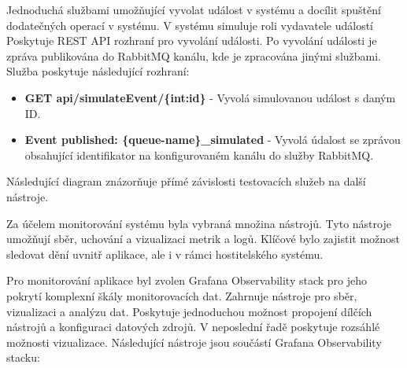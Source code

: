 
Jednoduchá službami umožňující vyvolat událost v systému a docílit spuštění dodatečných operací v systému. V systému simuluje roli vydavatele událostí Poskytuje REST API rozhraní pro vyvolání události. Po vyvolání události je zpráva publikována do RabbitMQ kanálu, kde je zpracována jinými službami. Služba poskytuje následující rozhraní:

\begin{itemize}
    \item \textbf{GET api/simulateEvent/\{int:id\}} - Vyvolá simulovanou událost s daným ID.
    \item \textbf{Event published: \{queue-name\}\_simulated} - Vyvolá údalost se zprávou obsahující identifikator na konfigurovaném kanálu do služby RabbitMQ.
\end{itemize}

Následující diagram znázorňuje přímé závislosti testovacích služeb na další nástroje.



Za účelem monitorování systému byla vybraná množina nástrojů. Tyto nástroje umožňují sběr, uchování a vizualizaci metrik a logů. Klíčové bylo zajistit možnost sledovat dění uvnitř aplikace, ale i v rámci hostitelského systému. 


Pro monitorování aplikace byl zvolen Grafana Observability stack pro jeho pokrytí komplexní škály monitorovacích dat. Zahrnuje nástroje pro sběr, vizualizaci a analýzu dat. Poskytuje jednoduchou možnost propojení dílčích nástrojů a konfiguraci datových zdrojů. V neposlední řadě poskytuje rozsáhlé možnosti vizualizace. Následující nástroje jsou součástí Grafana Observability stacku:

